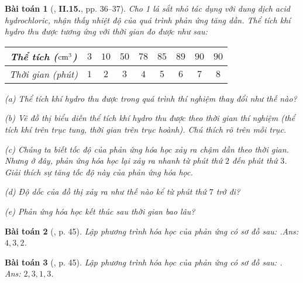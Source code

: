 \documentclass{article}
\numberwithin{equation}{section}
\newtheorem{baitoan}{Bài toán}
\begin{document}
\begin{baitoan}[\cite{Truong2021}, \textbf{II.15.}, pp. 36--37]
	Cho 1 lá sắt nhỏ tác dụng với dung dịch acid hydrochloric, nhận thấy nhiệt độ của quá trình phản ứng tăng dần. Thể tích khí hydro thu được tương ứng với thời gian đo được như sau:
	
	\begin{table}[H]
		\centering
		\begin{tabular}{|c|c|c|c|c|c|c|c|c|}
			\hline
			Thể tích ($\rm cm^3$) & $3$ & $10$ & $50$ & $78$ & $85$ & $89$ & $90$ & $90$ \\
			\hline
			Thời gian (phút) & $1$ & $2$ & $3$ & $4$ & $5$ & $6$ & $7$ & $8$ \\
			\hline
		\end{tabular}
	\end{table}
	\begin{enumerate*}
		\item[(a)] Thể tích khí hydro thu được trong quá trình thí nghiệm thay đổi như thế nào?
		\item[(b)] Vẽ đồ thị biểu diễn thể tích khí hydro thu được theo thời gian thí nghiệm (thể tích khí trên trục tung, thời gian trên trục hoành). Chú thích rõ trên mỗi trục.
		\item[(c)] Chúng ta biết tốc độ của phản ứng hóa học xảy ra chậm dần theo thời gian. Nhưng ở đây, phản ứng hóa học lại xảy ra nhanh từ phút thứ $2$ đến phút thứ $3$. Giải thích sự tăng tốc độ này của phản ứng hóa học.
		\item[(d)] Độ dốc của đồ thị xảy ra như thế nào kể từ phút thứ $7$ trở đi?
		\item[(e)] Phản ứng hóa học kết thúc sau thời gian bao lâu?
	\end{enumerate*}
\end{baitoan}

\begin{baitoan}[\cite{An_400_BT_Hoa_Hoc_8_2020}, p. 45]
	Lập phương trình hóa học của phản ứng có sơ đồ sau: \emph{}.\hfill\textsf{Ans:} $4,3,2$.
\end{baitoan}

\begin{baitoan}[\cite{An_400_BT_Hoa_Hoc_8_2020}, p. 45]
	Lập phương trình hóa học của phản ứng có sơ đồ sau: \emph{}.\\\mbox{}\hfill\textsf{Ans:} $2,3,1,3$.
\end{baitoan}

\end{document}
